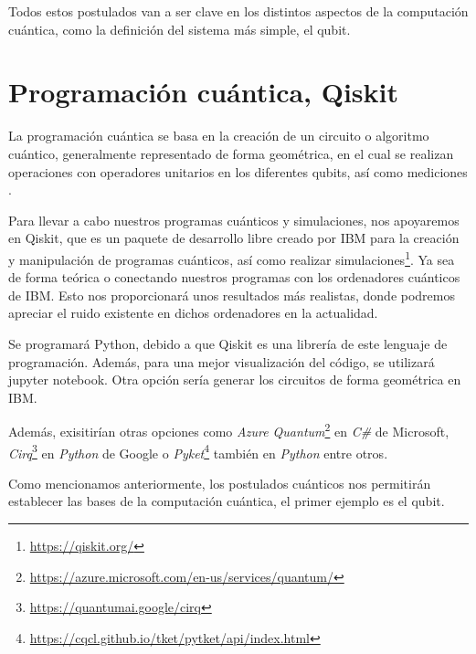 Todos estos postulados van a ser clave en los distintos aspectos de la computación cuántica, como la definición del sistema más simple, el qubit.

\vspace{10pt}
\section{Programación cuántica, Qiskit}
\label{Sec2.3:Qiskit}

 La programación cuántica se basa en la creación de un circuito o algoritmo cuántico, generalmente representado de forma geométrica, en el cual se realizan operaciones con operadores unitarios en los diferentes qubits, así como mediciones \cite{B:QuantumScientist:2008}.

 \vspace{8pt} 

 Para llevar a cabo nuestros programas cuánticos y simulaciones, nos apoyaremos en Qiskit, que es un paquete de desarrollo libre creado por IBM para la creación y manipulación de programas cuánticos, así como realizar simulaciones\footnote{\url{https://qiskit.org/}}. Ya sea de forma teórica o conectando nuestros programas con los ordenadores cuánticos de IBM. Esto nos proporcionará unos resultados más realistas, donde podremos apreciar el ruido existente en dichos ordenadores en la actualidad.

 \vspace{8pt} 
 
 Se programará Python, debido a que Qiskit es una librería de este lenguaje de programación. Además, para una mejor visualización del código, se utilizará jupyter notebook. Otra opción sería generar los circuitos de forma geométrica en IBM.


 Además, exisitirían otras opciones como \textit{Azure Quantum}\footnote{\url{https://azure.microsoft.com/en-us/services/quantum/}} en \textit{C\#} de Microsoft, \textit{Cirq}\footnote{\url{https://quantumai.google/cirq}} en \textit{Python} de Google o \textit{Pyket}\footnote{\url{https://cqcl.github.io/tket/pytket/api/index.html}} también en \textit{Python} entre otros. \newline
 
 Como mencionamos anteriormente, los postulados cuánticos nos permitirán establecer las bases de la computación cuántica, el primer ejemplo es el qubit. \newline
 
